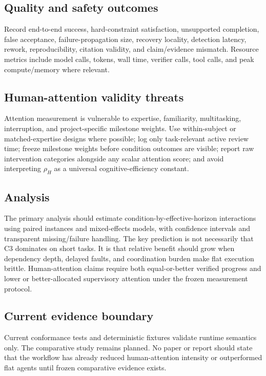 \documentclass[11pt,a4paper]{article}
\begin{document}
\subsection{Quality and safety outcomes}
Record end-to-end success, hard-constraint satisfaction, unsupported completion, false acceptance, failure-propagation size, recovery locality, detection latency, rework, reproducibility, citation validity, and claim/evidence mismatch. Resource metrics include model calls, tokens, wall time, verifier calls, tool calls, and peak compute/memory where relevant.

\subsection{Human-attention validity threats}
Attention measurement is vulnerable to expertise, familiarity, multitasking, interruption, and project-specific milestone weights. Use within-subject or matched-expertise designs where possible; log only task-relevant active review time; freeze milestone weights before condition outcomes are visible; report raw intervention categories alongside any scalar attention score; and avoid interpreting $\rho_H$ as a universal cognitive-efficiency constant.

\subsection{Analysis}
The primary analysis should estimate condition-by-effective-horizon interactions using paired instances and mixed-effects models, with confidence intervals and transparent missing/failure handling. The key prediction is not necessarily that C3 dominates on short tasks. It is that relative benefit should grow when dependency depth, delayed faults, and coordination burden make flat execution brittle. Human-attention claims require both equal-or-better verified progress and lower or better-allocated supervisory attention under the frozen measurement protocol.

\subsection{Current evidence boundary}
Current conformance tests and deterministic fixtures validate runtime semantics only. The comparative study remains planned. No paper or report should state that the workflow has already reduced human-attention intensity or outperformed flat agents until frozen comparative evidence exists.
\end{document}

